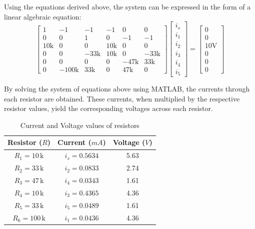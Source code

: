 \documentclass{article}
\begin{document}
{Using the equations derived above, the system can be expressed in the form of a linear algebraic equation:
\begin{equation}
  \begin{bmatrix}
    1 & -1 & -1 & -1 &  0 &  0  \\
    0 &  0 &  1 &   0& -1 & -1  \\
   10\text{k} &  0 &  0 & 10\text{k} & 0 & 0  \\
    0 &  0 & -33\text{k} & 10\text{k} &  0 & -33\text{k}   \\
    0 &  0 &  0 &  0& -47\text{k} & 33\text{k}   \\
    0 & -100\text{k} & 33\text{k}& 0 & 47\text{k}  & 0
  \end{bmatrix}
  \begin{bmatrix}
    i_s  \\
    i_1  \\
    i_2  \\
    i_3  \\
    i_4  \\
    i_5  
  \end{bmatrix}
  =
  \begin{bmatrix}
    0  \\
    0  \\
    10\text{V}  \\
    0  \\
    0  \\
    0  
  \end{bmatrix}
\end{equation}


By solving the system of equations above using MATLAB, the currents through each resistor are obtained. These currents, when multiplied by the respective resistor values, yield the corresponding voltages across each resistor.


\begin{table}[ht]
\begin{center}
\begin{tabular}{|c|c|c|}
\hline 
\textbf{Resistor ($R$)} & \textbf{Current ($mA$)} & \textbf{Voltage ($V$)} \\
\hline \hline
$R_1 = 10\,\text{k}$ & $i_s = 0.5634$ & 5.63\\ \hline
$R_2 = 33\,\text{k}$ & $i_2 = 0.0833$ & 2.74 \\  \hline
$R_3 = 47\,\text{k}$ & $i_4 = 0.0343$ & 1.61 \\ \hline
$R_4 = 10\,\text{k}$ & $i_3 = 0.4365$ & 4.36 \\ \hline
$R_5 = 33\,\text{k}$ & $i_5 = 0.0489$ & 1.61 \\ \hline
$R_6 = 100\,\text{k}$ & $i_1 = 0.0436$& 4.36  \\ \hline
\end{tabular}
\caption{Current and Voltage values of resistors}
\end{center}
\end{table}
}
\end{document}
